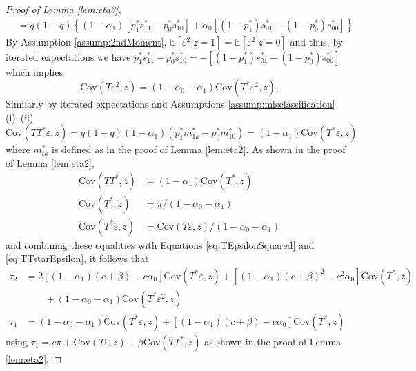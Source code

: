 \begin{proof}[Proof of Lemma \ref{lem:eta3}]
\begin{align*}
  &= q(1 - q)\left\{ (1 - \alpha_1)\left[p^*_1 s_{11}^* - p_0^* s_{10}^*\right] + \alpha_0 \left[ (1 - p_1^*)s_{01}^* - (1 - p_0^*) s_{00}^*\right] \right\}
\end{align*}
By Assumption \ref{assump:2ndMoment}, $\mathbb{E}[\varepsilon^2|z=1] = \mathbb{E}[\varepsilon^2|z=0]$ and thus, by iterated expectations we have
$p_1^* s_{11}^* - p_0^* s^*_{10} =  - \left[(1 - p_1^*)s_{01}^* - (1 - p_0^*)s_{00}^* \right]$
which implies 
\begin{equation}
  \mbox{Cov}(T\varepsilon^2,z) = (1 - \alpha_0 - \alpha_1)\mbox{Cov}(T^*\varepsilon^2,z).
  \label{eq:TEpsilonSquared}
\end{equation}
Similarly by iterated expectations and Assumptions \ref{assump:misclassification} (i)--(ii)
\begin{equation}
  \mbox{Cov}(TT^*\varepsilon, z) = q(1 - q)(1 - \alpha_1)(p_1^* m_{1k}^* - p_0^* m_{10}^*) = (1 - \alpha_1) \mbox{Cov}(T^*\varepsilon, z) 
  \label{eq:TTstarEpsilon}
\end{equation}
where $m_{tk}^*$ is defined as in the proof of Lemma \ref{lem:eta2}.
As shown in the proof of Lemma \ref{lem:eta2}, 
\begin{align*}
  \mbox{Cov}(TT^*,z) &= (1 - \alpha_1) \mbox{Cov}(T^*,z)\\ 
  \mbox{Cov}(T^*,z) &= \pi / (1 - \alpha_0 - \alpha_1)\\
  \mbox{Cov}(T^*\varepsilon,z) &= \mbox{Cov}(T\varepsilon,z) / (1 - \alpha_0 - \alpha_1)
\end{align*}
and combining these equalities with Equations \ref{eq:TEpsilonSquared} and \ref{eq:TTstarEpsilon}, it follows that
\begin{align*}
  \tau_2 &=  2\left[(1 - \alpha_1)(c + \beta) - c \alpha_0\right]\mbox{Cov}(T^*\varepsilon,z) + \left[(1 - \alpha_1)(c + \beta)^2 - c^2 \alpha_0 \right]\mbox{Cov}(T^*,z)\\
  &\quad \quad +(1 - \alpha_0 - \alpha_1)\mbox{Cov}(T^*\varepsilon^2,z) \\
  \tau_1 &= (1 - \alpha_0 - \alpha_1)\mbox{Cov}(T^*\varepsilon,z) + \left[(1 - \alpha_1)(c + \beta) - c \alpha_0\right] \mbox{Cov}(T^*,z)
\end{align*}
using $\tau_1 = c\pi + \mbox{Cov}(T\varepsilon,z) + \beta\mbox{Cov}(TT^*,z)$ as shown in the proof of Lemma \ref{lem:eta2}.

\end{proof}
